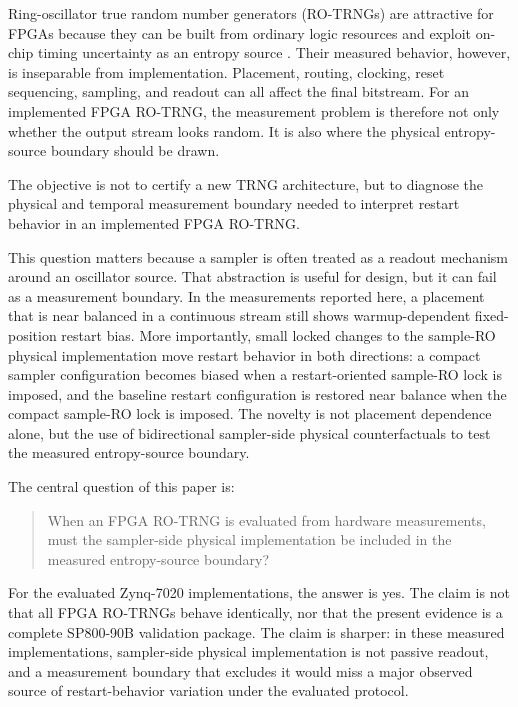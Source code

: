 \documentclass[journal]{IEEEtran}
\newcommand{\rotrng}{RO-TRNG}
\newcommand{\spn}{SP800-90B}
\begin{document}
Ring-oscillator true random number generators (\rotrng{}s) are attractive for FPGAs because they can be built from ordinary logic resources and exploit on-chip timing uncertainty as an entropy source \cite{Sunar_2007,Fischer_2008,Wold_2009}. Their measured behavior, however, is inseparable from implementation. Placement, routing, clocking, reset sequencing, sampling, and readout can all affect the final bitstream. For an implemented FPGA \rotrng{}, the measurement problem is therefore not only whether the output stream looks random. It is also where the physical entropy-source boundary should be drawn.

The objective is not to certify a new TRNG architecture, but to diagnose the physical and temporal measurement boundary needed to interpret restart behavior in an implemented FPGA \rotrng{}.

This question matters because a sampler is often treated as a readout mechanism around an oscillator source. That abstraction is useful for design, but it can fail as a measurement boundary. In the measurements reported here, a placement that is near balanced in a continuous stream still shows warmup-dependent fixed-position restart bias. More importantly, small locked changes to the sample-RO physical implementation move restart behavior in both directions: a compact sampler configuration becomes biased when a restart-oriented sample-RO lock is imposed, and the baseline restart configuration is restored near balance when the compact sample-RO lock is imposed. The novelty is not placement dependence alone, but the use of bidirectional sampler-side physical counterfactuals to test the measured entropy-source boundary.

The central question of this paper is:

\begin{quote}
When an FPGA \rotrng{} is evaluated from hardware measurements, must the sampler-side physical implementation be included in the measured entropy-source boundary?
\end{quote}

For the evaluated Zynq-7020 implementations, the answer is yes. The claim is not that all FPGA \rotrng{}s behave identically, nor that the present evidence is a complete \spn{} validation package. The claim is sharper: in these measured implementations, sampler-side physical implementation is not passive readout, and a measurement boundary that excludes it would miss a major observed source of restart-behavior variation under the evaluated protocol.
\end{document}
